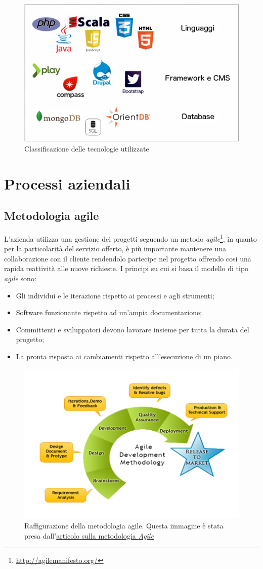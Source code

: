 \begin{figure}[h]
\centering
\includegraphics[width=0.6\linewidth]{immagini/White}
\caption[Classificazione delle tecnologie utilizzate]{Classificazione delle tecnologie utilizzate}
\label{fig:White}
\end{figure}


\section{Processi aziendali}
\subsection{Metodologia agile}
L'azienda utilizza una gestione dei progetti seguendo un metodo \textit{agile}\footnote{\url{http://agilemanifesto.org/}}, in quanto per la particolarità del servizio offerto, è più importante mantenere una collaborazione con il cliente rendendolo partecipe nel progetto offrendo cosi una rapida reattività alle nuove richieste. I principi su cui si basa il modello di tipo \textit{agile} sono:
\begin{itemize}
	\item Gli individui  e le iterazione rispetto ai processi  e agli strumenti;
	\item Software funzionante rispetto ad un'ampia documentazione;
	\item Committenti e sviluppatori devono lavorare insieme per tutta la durata del progetto;
	\item La pronta risposta ai cambiamenti rispetto all'esecuzione di un piano.
\end{itemize}

\begin{figure}[h]
\centering
\includegraphics[width=0.7\linewidth]{immagini/agile}
\caption[Raffigurazione della metodologia agile]{Raffigurazione della metodologia agile. Questa immagine è stata presa dall'\href{URL}{articolo sulla metodologia \textit{Agile}}}
\label{fig:agile}
\end{figure}


